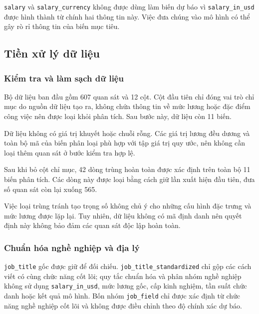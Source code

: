\texttt{salary} và \texttt{salary\_currency} không được dùng làm biến dự
báo vì \texttt{salary\_in\_usd} được hình thành từ chính hai thông tin
này. Việc đưa chúng vào mô hình có thể gây rò rỉ thông tin của biến mục
tiêu.

\subsection{Tiền xử lý dữ
liệu}\label{nghi:tiux1ec1n-xux1eed-luxfd-dux1eef-liux1ec7u}

\subsubsection{Kiểm tra và làm sạch dữ
liệu}\label{nghi:kiux1ec3m-tra-vuxe0-luxe0m-sux1ea1ch-dux1eef-liux1ec7u}

Bộ dữ liệu ban đầu gồm 607 quan sát và 12 cột. Cột đầu tiên chỉ đóng vai
trò chỉ mục do nguồn dữ liệu tạo ra, không chứa thông tin về mức lương
hoặc đặc điểm công việc nên được loại khỏi phân tích. Sau bước này, dữ
liệu còn 11 biến.

Dữ liệu không có giá trị khuyết hoặc chuỗi rỗng. Các giá trị lương đều
dương và toàn bộ mã của biến phân loại phù hợp với tập giá trị quy ước,
nên không cần loại thêm quan sát ở bước kiểm tra hợp lệ.

Sau khi bỏ cột chỉ mục, 42 dòng trùng hoàn toàn được xác định trên toàn
bộ 11 biến phân tích. Các dòng này được loại bằng cách giữ lần xuất hiện
đầu tiên, đưa số quan sát còn lại xuống 565.

Việc loại trùng tránh tạo trọng số không chủ ý cho những cấu hình đặc
trưng và mức lương được lặp lại. Tuy nhiên, dữ liệu không có mã định
danh nên quyết định này không bảo đảm các quan sát độc lập hoàn toàn.

\subsubsection{Chuẩn hóa nghề nghiệp và địa
lý}\label{nghi:chuux1ea9n-huxf3a-nghux1ec1-nghiux1ec7p-vuxe0-ux111ux1ecba-luxfd}

\texttt{job\_title} gốc được giữ để đối chiếu.
\texttt{job\_title\_standardized} chỉ gộp các cách viết có cùng chức
năng cốt lõi; quy tắc chuẩn hóa và phân nhóm nghề nghiệp không sử dụng
\texttt{salary\_in\_usd}, mức lương gốc, cấp kinh nghiệm, tần suất chức
danh hoặc kết quả mô hình. Bốn nhóm \texttt{job\_field} chỉ được xác
định từ chức năng nghề nghiệp cốt lõi và không được điều chỉnh theo độ
chính xác dự báo.

